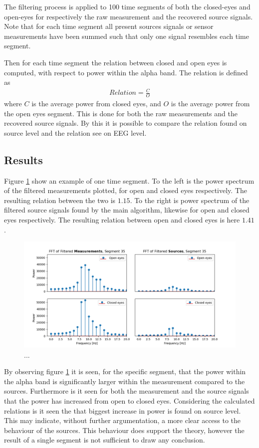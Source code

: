 The filtering process is applied to 100 time segments of both the closed-eyes and open-eyes for respectively the raw measurement and the recovered source signals. 
Note that for each time segment all present sources signals or sensor measurements have been summed such that only one signal resembles each time segment.

Then for each time segment the relation between closed and open eyes is computed, with respect to power within the alpha band. The relation is defined as 
\begin{align*}
Relation = \frac{C}{O} 
\end{align*}
where $C$ is the average power from closed eyes, and $O$ is the average power from the open eyes segment. 
This is done for both the raw measurements and the recovered source signals. By this it is possible to compare the relation found on source level and the relation see on EEG level.  

\subsection{Results}
Figure \ref{fig:dft_2} show an example of one time segment. To the left is the power spectrum of the filtered measurements plotted, for open and closed eyes respectively. The resulting relation between the two is $1.15$. To the right is power spectrum of the filtered source signals found by the main algorithm, likewise for open and closed eyes respectively. The resulting relation between open and closed eyes is here $1.41$.  
\begin{figure}[H]
\centering
\includegraphics[scale=0.5]{figures/ch_7/FFT_plot.png}
\caption{...}
\label{fig:dft_2}
\end{figure}
\noindent
By observing figure \ref{fig:dft_2} it is seen, for the specific segment, that the power within the alpha band is significantly larger within the measurement compared to the sources. Furthermore is it seen for both the measurement and the source signals that the power has increased from open to closed eyes. Considering the calculated relations is it seen the that biggest increase in power is found on source level. This may indicate, without further argumentation, a more clear access to the behaviour of the sources. 
This behaviour does support the theory, however the result of a single segment is not sufficient to draw any conclusion.          

